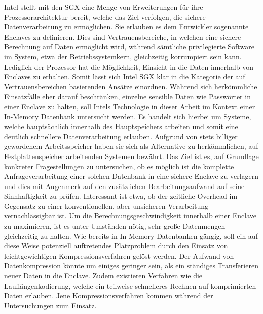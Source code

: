 Intel stellt mit den \ac{SGX} eine Menge von Erweiterungen für ihre Prozessorarchitektur bereit, welche das Ziel verfolgen, die sichere Datenverarbeitung zu ermöglichen. Sie erlauben es dem Entwickler sogenannte Enclaves zu definieren. Dies sind Vertrauensbereiche, in welchen eine sichere Berechnung auf Daten ermöglicht wird, während sämtliche privilegierte Software im System, etwa der Betriebssystemkern, gleichzeitig korrumpiert sein kann. Lediglich der Prozessor hat die Möglichkeit, Einsicht in die Daten innerhalb von Enclaves zu erhalten. Somit lässt sich Intel \ac{SGX} klar in die Kategorie der auf Vertrauensbereichen basierenden Ansätze einordnen. Während sich herkömmliche Einsatzfälle eher darauf beschränken, einzelne sensible Daten wie Passwörter in einer Enclave zu halten, soll Intels Technologie in dieser Arbeit im Kontext einer In-Memory Datenbank untersucht werden. Es handelt sich hierbei um Systeme, welche hauptsächlich innerhalb des Hauptspeichers arbeiten und somit eine deutlich schnellere Datenverarbeitung erlauben. Aufgrund von stets billiger gewordenem Arbeitsspeicher haben sie sich als Alternative zu herkömmlichen, auf Festplattenspeicher arbeitenden Systemen bewährt. Das Ziel ist es, auf Grundlage konkreter Fragestellungen zu untersuchen, ob es möglich ist die komplette Anfrageverarbeitung einer solchen Datenbank in eine sichere Enclave zu verlagern und dies mit Augenmerk auf den zusätzlichen Bearbeitungsaufwand auf seine Sinnhaftigkeit zu prüfen. Interessant ist etwa, ob der zeitliche Overhead im Gegensatz zu einer konventionellen, aber unsicheren Verarbeitung vernachlässigbar ist. Um die Berechnungsgeschwindigkeit innerhalb einer Enclave zu maximieren, ist es unter Umständen nötig, sehr große Datenmengen gleichzeitig zu halten. Wie bereits in In-Memory Datenbanken gängig, soll ein auf diese Weise potenziell auftretendes Platzproblem durch den Einsatz von leichtgewichtigen Kompressionsverfahren gelöst werden. Der Aufwand von Datenkompression könnte um einiges geringer sein, als ein ständiges Transferieren neuer Daten in die Enclave. Zudem existieren Verfahren wie die Lauflängenkodierung, welche ein teilweise schnelleres Rechnen auf komprimierten Daten erlauben. Jene Kompressionsverfahren kommen während der Untersuchungen zum Einsatz.

